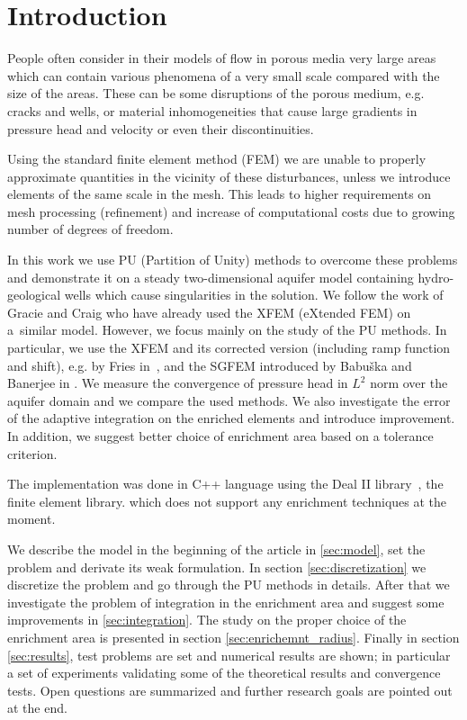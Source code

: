 \documentclass[preprint,12pt]{elsarticle}
\begin{document}

\section{Introduction}
\label{sec:introduction}

People often consider in their models of flow in porous media very large areas which can contain various 
phenomena of a very small scale compared with the size of the areas. These can be some disruptions of the porous 
medium, e.g. cracks and wells, or material inhomogeneities that cause large gradients in pressure head and 
velocity or even their discontinuities.

Using the standard finite element method (FEM) we are unable to properly approximate quantities in the 
vicinity of these disturbances, unless we introduce elements of the same scale in the mesh. This leads to 
higher requirements on mesh processing (refinement) and increase of computational costs due to growing number  
of degrees of freedom.

In this work we use PU (Partition of Unity) methods to overcome these problems and demonstrate it on a steady 
two-dimensional aquifer model containing hydro-geological wells which cause singularities in the solution. 
We follow the work \cite{gracie,craig} of Gracie and Craig who have already used the XFEM (eXtended FEM) 
on a~similar model. However, we focus mainly on the study of the PU methods. In particular, we use the XFEM 
and its corrected version (including ramp function and shift), e.g. by Fries in~\cite{cxfem}, 
and the SGFEM introduced by Babu{\v s}ka and Banerjee in \cite{sgfem,sgfem2013}. We measure 
the convergence of pressure head in $L^2$ norm over the aquifer domain and we compare the used methods. 
We also investigate the error of the adaptive integration on the enriched elements and introduce improvement. 
In addition, we suggest better choice of enrichment area based on a tolerance criterion.

The implementation was done in C++ language using the Deal II library~\cite{deal}, the finite element library.
which does not support any enrichment techniques at the moment.

We describe the model in the beginning of the article in \ref{sec:model}, set the problem and derivate its weak formulation. 
In section \ref{sec:discretization} we discretize the problem and go through the PU methods 
in details. After that we investigate the problem of integration in the enrichment area and suggest some 
improvements in \ref{sec:integration}. The study on the proper choice of the enrichment area is presented in 
section \ref{sec:enrichemnt_radius}. 
Finally in section \ref{sec:results}, test problems are set and numerical results are shown; 
in particular a set of experiments validating some of the theoretical results and convergence tests.
Open questions are summarized and further research goals are pointed out at the end. 
\end{document}
